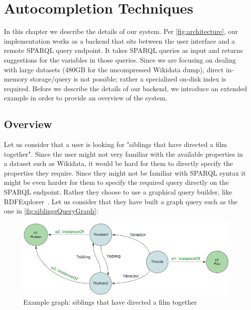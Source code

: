 \chapter{Autocompletion Techniques}
\label{chap:Backend}

In this chapter we describe the details of our system. Per \autoref{fig:architecture}, our implementation works as a backend that sits between the user interface and a remote SPARQL query endpoint. It takes SPARQL queries as input and returns suggestions for the variables in those queries. Since we are focusing on dealing with large datasets (480GB for the uncompressed Wikidata dump), direct in-memory storage/query is not possible; rather a specialized on-disk index is required.  Before we describe the details of our backend, we introduce an extended example in order to provide an overview of the system.

\section{Overview}

Let us consider that a user is looking for "siblings that have directed a film together". 
Since the user might not very familiar with the available properties in a dataset such as Wikidata, it would be hard for them to directly specify the properties they require. Since they might not be familiar with SPARQL syntax it might be even harder for them to specify the required query directly on the SPARQL endpoint. Rather they choose to use a graphical query builder, like RDFExplorer~\cite{Vargas2019}. Let us consider that they have built a graph query such as the one in \autoref{fig:siblingsQueryGraph}:

\begin{figure}[H]
    \centering
        \includegraphics[width=\linewidth]{imagenes/SiblingsGraph.png}
        \caption{Example graph: siblings that have directed a film together}
        \label{fig:siblingsQueryGraph}
\end{figure}

